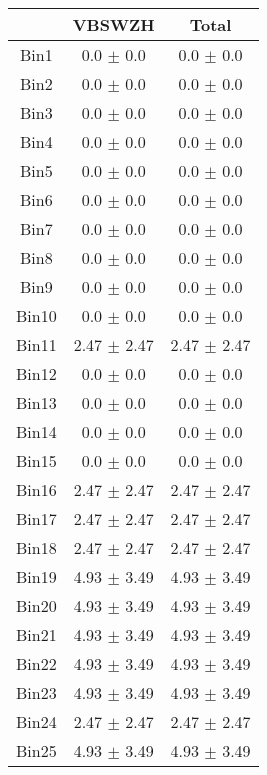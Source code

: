   \begin{tabular}{|c|c|c|}
  \hline
      & VBSWZH & Total \\ \cline{1-3} 
     \hline\hline
     Bin1 & 0.0 $\pm$ 0.0 & 0.0 $\pm$ 0.0 \\ \cline{1-3} 
     Bin2 & 0.0 $\pm$ 0.0 & 0.0 $\pm$ 0.0 \\ \cline{1-3} 
     Bin3 & 0.0 $\pm$ 0.0 & 0.0 $\pm$ 0.0 \\ \cline{1-3} 
     Bin4 & 0.0 $\pm$ 0.0 & 0.0 $\pm$ 0.0 \\ \cline{1-3} 
     Bin5 & 0.0 $\pm$ 0.0 & 0.0 $\pm$ 0.0 \\ \cline{1-3} 
     Bin6 & 0.0 $\pm$ 0.0 & 0.0 $\pm$ 0.0 \\ \cline{1-3} 
     Bin7 & 0.0 $\pm$ 0.0 & 0.0 $\pm$ 0.0 \\ \cline{1-3} 
     Bin8 & 0.0 $\pm$ 0.0 & 0.0 $\pm$ 0.0 \\ \cline{1-3} 
     Bin9 & 0.0 $\pm$ 0.0 & 0.0 $\pm$ 0.0 \\ \cline{1-3} 
     Bin10 & 0.0 $\pm$ 0.0 & 0.0 $\pm$ 0.0 \\ \cline{1-3} 
     Bin11 & 2.47 $\pm$ 2.47 & 2.47 $\pm$ 2.47 \\ \cline{1-3} 
     Bin12 & 0.0 $\pm$ 0.0 & 0.0 $\pm$ 0.0 \\ \cline{1-3} 
     Bin13 & 0.0 $\pm$ 0.0 & 0.0 $\pm$ 0.0 \\ \cline{1-3} 
     Bin14 & 0.0 $\pm$ 0.0 & 0.0 $\pm$ 0.0 \\ \cline{1-3} 
     Bin15 & 0.0 $\pm$ 0.0 & 0.0 $\pm$ 0.0 \\ \cline{1-3} 
     Bin16 & 2.47 $\pm$ 2.47 & 2.47 $\pm$ 2.47 \\ \cline{1-3} 
     Bin17 & 2.47 $\pm$ 2.47 & 2.47 $\pm$ 2.47 \\ \cline{1-3} 
     Bin18 & 2.47 $\pm$ 2.47 & 2.47 $\pm$ 2.47 \\ \cline{1-3} 
     Bin19 & 4.93 $\pm$ 3.49 & 4.93 $\pm$ 3.49 \\ \cline{1-3} 
     Bin20 & 4.93 $\pm$ 3.49 & 4.93 $\pm$ 3.49 \\ \cline{1-3} 
     Bin21 & 4.93 $\pm$ 3.49 & 4.93 $\pm$ 3.49 \\ \cline{1-3} 
     Bin22 & 4.93 $\pm$ 3.49 & 4.93 $\pm$ 3.49 \\ \cline{1-3} 
     Bin23 & 4.93 $\pm$ 3.49 & 4.93 $\pm$ 3.49 \\ \cline{1-3} 
     Bin24 & 2.47 $\pm$ 2.47 & 2.47 $\pm$ 2.47 \\ \cline{1-3} 
     Bin25 & 4.93 $\pm$ 3.49 & 4.93 $\pm$ 3.49 \\ \cline{1-3} 

\end{tabular}
